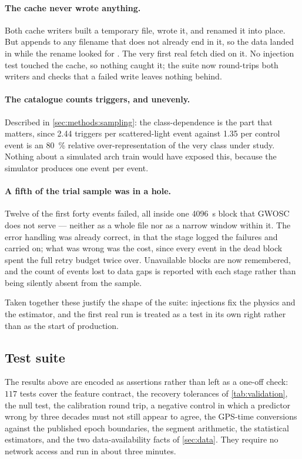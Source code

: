 \paragraph{The cache never wrote anything.} Both cache writers built a
temporary file, wrote it, and renamed it into place. But
 appends  to any filename that does
not already end in it, so the data landed in  while
the rename looked for . The very first real fetch died on
it. No injection test touched the cache, so nothing caught it; the suite now
round-trips both writers and checks that a failed write leaves nothing behind.

\paragraph{The catalogue counts triggers, and unevenly.} Described in
\cref{sec:methods:sampling}: the class-dependence is the part that matters,
since \num{2.44} triggers per scattered-light event against \num{1.35} per
control event is an \SI{80}{\percent} relative over-representation of the very
class under study. Nothing about a simulated arch train would have exposed
this, because the simulator produces one event per event.

\paragraph{A fifth of the trial sample was in a hole.} Twelve of the first
forty events failed, all inside one \SI{4096}{\second} block that GWOSC does
not serve --- neither as a whole file nor as a narrow window within it. The
error handling was already correct, in that the stage logged the failures and
carried on; what was wrong was the cost, since every event in the dead block
spent the full retry budget twice over. Unavailable blocks are now remembered,
and the count of events lost to data gaps is reported with each stage rather
than being silently absent from the sample.

Taken together these justify the shape of the suite: injections fix the
physics and the estimator, and the first real run is treated as a test in its
own right rather than as the start of production.

\subsection{Test suite}

The results above are encoded as assertions rather than left as a one-off
check: $117$ tests cover the feature contract, the recovery tolerances of
\cref{tab:validation}, the null test, the calibration round trip, a
negative control in which a predictor wrong by three decades must not still
appear to agree, the GPS-time conversions against the published epoch
boundaries, the segment arithmetic, the statistical estimators, and the two
data-availability facts of \cref{sec:data}. They require no network access and
run in about three minutes.
